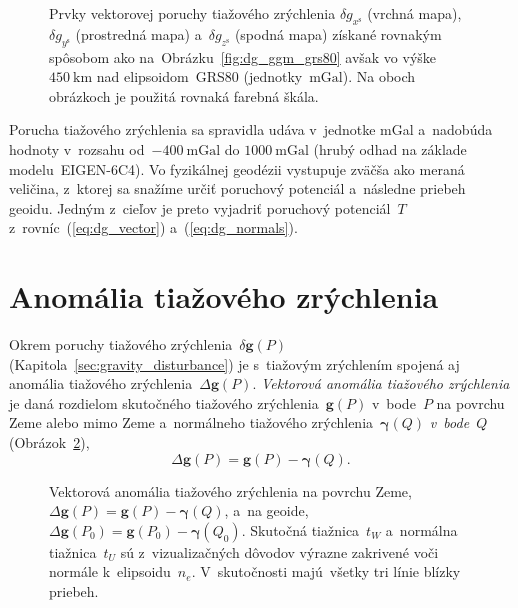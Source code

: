 \documentclass[a4paper, 12pt]{book}
\let\vec\mathbf
\begin{document}
\begin{figure}
\caption{Prvky vektorovej poruchy tiažového zrýchlenia $\delta 
g_{x^\mathrm{s}}$ (vrchná mapa), $\delta g_{y^\mathrm{s}}$ (prostredná mapa) 
a~$\delta g_{z^\mathrm{s}}$ (spodná mapa) získané rovnakým spôsobom ako 
na~Obrázku~\ref{fig:dg_ggm_grs80} avšak vo výške~$450\ \mathrm{km}$ nad 
elipsoidom~GRS80 (jednotky~$\mathrm{mGal}$).  Na oboch obrázkoch je použitá 
rovnaká farebná škála.}
\label{fig:dg_ggm_450km}
\end{figure}

Porucha tiažového zrýchlenia sa spravidla udáva v~jednotke mGal a~nadobúda 
hodnoty v~rozsahu od~$-400\ \mathrm{mGal}$ do $1000\ \mathrm{mGal}$ (hrubý 
odhad na základe modelu~EIGEN-6C4).  Vo fyzikálnej geodézii vystupuje zväčša 
ako meraná veličina, z~ktorej sa snažíme určiť poruchový potenciál a~následne 
priebeh geoidu.  Jedným z~cieľov je preto vyjadriť poruchový potenciál~$T$ 
z~rovníc~(\ref{eq:dg_vector}) a~(\ref{eq:dg_normals}).





\section{Anomália tiažového zrýchlenia}
\label{sec:gravity_anomaly}

Okrem poruchy tiažového zrýchlenia~$\delta \vec g(P)$ 
(Kapitola~\ref{sec:gravity_disturbance}) je s~tiažovým zrýchlením spojená aj 
anomália tiažového zrýchlenia~$\Delta \vec g(P)$.  \emph{Vektorová anomália 
tiažového zrýchlenia} je daná rozdielom skutočného tiažového zrýchlenia~$\vec 
g(P)$ v~bode~$P$ na povrchu Zeme alebo mimo Zeme a~normálneho tiažového 
zrýchlenia~$\boldsymbol\gamma(Q)$ \emph{v~bode~$Q$} 
(Obrázok~\ref{fig:gravity_anomaly}),
%
\begin{equation}
\label{eq:Dg_vector_earth}
\Delta \vec g(P) = \vec g(P) - \boldsymbol\gamma(Q).
\end{equation}

\begin{figure}[bt]
\centering

\caption{Vektorová anomália tiažového zrýchlenia na povrchu Zeme,~$\Delta \vec 
g(P) = \vec g(P) - \boldsymbol \gamma(Q)$, a~na geoide, $\Delta \vec g(P_0) 
= \vec g(P_0) - \boldsymbol\gamma(Q_0)$.  Skutočná tiažnica~$t_W$ a~normálna 
tiažnica~$t_U$ sú z~vizualizačných dôvodov výrazne zakrivené voči normále 
k~elipsoidu~$n_e$.  V~skutočnosti majú~všetky tri línie blízky priebeh.}
\label{fig:gravity_anomaly}
\end{figure}
\end{document}
